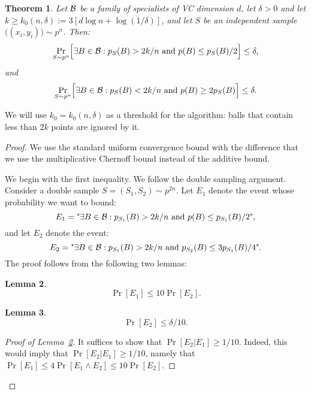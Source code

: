 \documentclass{article}
\newtheorem{theorem}{Theorem}[section]
\newtheorem{lemma}[theorem]{Lemma}
\newcommand{\B}{{\cal B}}
\newcommand{\samp}{S}
\begin{document}
\begin{theorem}\label{thm:uc1}
Let $\B$ be a family of specialists of VC dimension $d$,
let $\delta>0$ and let $k \geq k_0(n,\delta) := 3\left[  d \log n + \log(1/\delta) \right]$,
and let $S$ be an independent sample $\bigl((x_i,y_i)\bigr) \sim p^n$. Then:
\[\Pr_{\samp \sim p^{n}}\Bigl[\exists {B\in\B}:
  p_{\samp}(B)>2k/n \mbox{ and } p(B) \leq {p_{\samp}(B)}/{2} \Bigr] \leq \delta,
\]
and
\[\Pr_{\samp \sim p^{n}}\Bigl[\exists {B\in\B}:
  p_{\samp}(B)< 2k/n \mbox{ and } p(B) \geq 2p_{\samp}(B) \Bigr] \leq \delta.
\]
\end{theorem}


We will use $k_0=k_0(n,\delta)$ as a threshold for the algorithm:
balls that contain less than $2k$ points are ignored by it.

\begin{proof}
We use the standard uniform convergence bound with
the difference that we use the multiplicative Chernoff bound instead
of the additive bound. 

We begin with the first inequality.  
We follow the double sampling argument.
Consider a double sample $S=(\samp_1,\samp_2)\sim p^{2n}$.
Let $E_1$ denote the event whose probability we want to bound:
\[
E_1 = \text{"}\exists {B\in\B}:
  p_{\samp_1}(B)>2k/n \mbox{ and } p(B) \leq {p_{\samp_1}(B)}/{2}
\text{"}, 
\]
and let $E_2$ denote the event:
\[
E_2 = \text{"}\exists {B\in\B}:
  p_{\samp_1}(B)>2k/n \mbox{ and } p_{\samp_2}(B) \leq {3p_{\samp_1}(B)}/{4}
\text{"}.
\]
The proof follows from the following two lemmas:
\begin{lemma}\label{lem:auxuc1}
\[\Pr[E_1]\leq 10\Pr[E_2].\]
\end{lemma}
\begin{lemma}\label{lem:auxuc2}
\[\Pr[E_2]\leq \delta/10.\]
\end{lemma}

\begin{proof}[Proof of Lemma~\ref{lem:auxuc1}]


It suffices to show that $\Pr[E_2 \vert E_1]\geq 1/10$.
Indeed, this would imply that $\Pr[E_2 \vert E_1]\geq 1/10$, 
namely that $\Pr[E_1] \leq 4\Pr[E_1 \land E_2]\leq 10\Pr[E_2]$.


\end{proof}
\end{proof}
\end{document}
